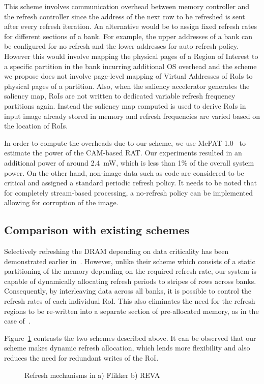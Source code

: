 This scheme involves communication overhead between memory controller and the refresh controller since the address of the next row to be refreshed is sent after every refresh iteration. An alternative would be to assign fixed refresh rates for different sections of a bank. For example, the upper addresses of a bank can be configured for no refresh and the lower addresses for auto-refresh policy. However this would involve mapping the physical pages of a Region of Interest to a specific partition in the bank incurring additional OS overhead and the scheme we propose does not involve page-level mapping of Virtual Addresses of RoIs to physical pages of a partition. Also, when the saliency accelerator generates the saliency map, RoIs are not written to dedicated variable refresh frequency partitions again. Instead the saliency map computed is used to derive RoIs in input image already stored in memory and refresh frequencies are varied based on the location of RoIs. 

In order to compute the overheads due to our scheme, we use McPAT 1.0~\cite{mcpat} to estimate the power of the CAM-based RAT. Our experiments resulted in an additional power of around 2.4~mW, which is less than 1\% of the overall system power. On the other hand, non-image data such as code are considered to be critical and assigned a standard periodic refresh policy.
It needs to be noted that for completely stream-based processing, a no-refresh policy can be implemented allowing for corruption of the image.

\subsection{Comparison with existing schemes}
Selectively refreshing the DRAM depending on data criticality has been demonstrated earlier in~\cite{Liu2011}. However, unlike their scheme which consists of a static partitioning of the memory depending on the required refresh rate, our system is capable of dynamically allocating refresh periods to stripes of rows across banks. Consequently, by interleaving data across all banks, it is possible to control the refresh rates of each individual RoI. 
This also eliminates the need for the refresh regions to be re-written into a separate section of pre-allocated memory, as in the case of~\cite{Liu2011}.

Figure~\ref{fig:reva-refresh} contrasts the two schemes described above. It can be observed that our scheme makes dynamic refresh allocation, which lends more flexibility and also reduces the need for redundant writes of the RoI.

\begin{figure}[ht!]
\centering
{}
\caption{\label{fig:reva-refresh} Refresh mechanisms in a) Flikker  b) REVA}
\vspace{-0.2in}
\end{figure}
